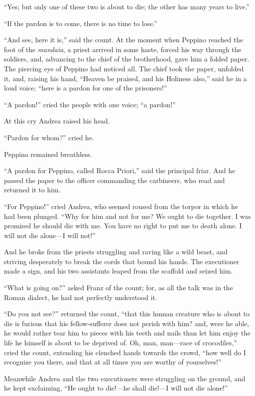 “Yes; but only one of these two is about to die; the other has many
years to live.”

“If the pardon is to come, there is no time to lose.”

“And see, here it is,” said the count. At the moment when Peppino
reached the foot of the \textit{mandaïa}, a priest arrived in some haste,
forced his way through the soldiers, and, advancing to the chief of the
brotherhood, gave him a folded paper. The piercing eye of Peppino had
noticed all. The chief took the paper, unfolded it, and, raising his
hand, “Heaven be praised, and his Holiness also,” said he in a loud
voice; “here is a pardon for one of the prisoners!”

“A pardon!” cried the people with one voice; “a pardon!”

At this cry Andrea raised his head.

“Pardon for whom?” cried he.

Peppino remained breathless.

“A pardon for Peppino, called Rocca Priori,” said the principal friar.
And he passed the paper to the officer commanding the carbineers, who
read and returned it to him.

“For Peppino!” cried Andrea, who seemed roused from the torpor in which
he had been plunged. “Why for him and not for me? We ought to die
together. I was promised he should die with me. You have no right to
put me to death alone. I will not die alone—I will not!”

And he broke from the priests struggling and raving like a wild beast,
and striving desperately to break the cords that bound his hands. The
executioner made a sign, and his two assistants leaped from the
scaffold and seized him.

“What is going on?” asked Franz of the count; for, as all the talk was
in the Roman dialect, he had not perfectly understood it.

“Do you not see?” returned the count, “that this human creature who is
about to die is furious that his fellow-sufferer does not perish with
him? and, were he able, he would rather tear him to pieces with his
teeth and nails than let him enjoy the life he himself is about to be
deprived of. Oh, man, man—race of crocodiles,” cried the count,
extending his clenched hands towards the crowd, “how well do I
recognize you there, and that at all times you are worthy of
yourselves!”

Meanwhile Andrea and the two executioners were struggling on the
ground, and he kept exclaiming, “He ought to die!—he shall die!—I will
not die alone!”

